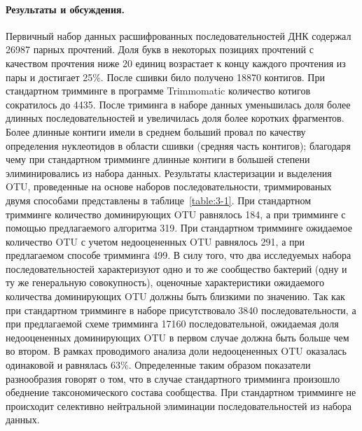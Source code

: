 \documentclass[a4paper,12pt,openany,final]{extreport}
\begin{document}
\paragraph{Результаты и обсуждения.} Первичный набор данных
расшифрованных последовательностей ДНК содержал 26987 парных прочтений.
Доля букв в некоторых позициях прочтений с качеством прочтения ниже 20
единиц возрастает к концу каждого прочтения из пары и достигает 25\%.
После сшивки било получено 18870 контигов. При стандартном тримминге в
программе Trimmomatic количество котигов сократилось до 4435. После
триминга в наборе данных уменьшилась доля более длинных
последовательностей и увеличилась доля более коротких фрагментов. Более
длинные контиги имели в среднем больший провал по качеству определения
нуклеотидов в области сшивки (средняя часть контигов); благодаря чему
при стандартном тримминге длинные контиги в большей степени
элиминировались из набора данных. Результаты кластеризации и выделения
OTU, проведенные на основе наборов последовательности, триммированых
двумя способами представлены в таблице~\ref{table:3-1}. При стандартном тримминге
количество доминирующих OTU равнялось 184, а при тримминге с помощью
предлагаемого алгоритма 319. При стандартном тримминге ожидаемое
количество OTU с учетом недооцененных OTU равнялось 291, а при
предлагаемом способе тримминга 499. В силу того, что два исследуемых
набора последовательностей характеризуют одно и то же сообщество
бактерий (одну и ту же генеральную совокупность), оценочные
характеристики ожидаемого количества доминирующих OTU должны быть
близкими по значению. Так как при стандартном тримминге в наборе
присутствовало 3840 последовательности, а при предлагаемой схеме
тримминга 17160 последовательной, ожидаемая доля недооцененных
доминирующих OTU в первом случае должна быть больше чем во втором. В
рамках проводимого анализа доли недооцененных OTU оказалась одинаковой и
равнялась 63\%. Определенные таким образом показатели разнообразия
говорят о том, что в случае стандартного тримминга произошло обеднение
таксономического состава сообщества. При стандартном тримминге не
происходит селективно нейтральной элиминации последовательностей из
набора данных.
\end{document}
